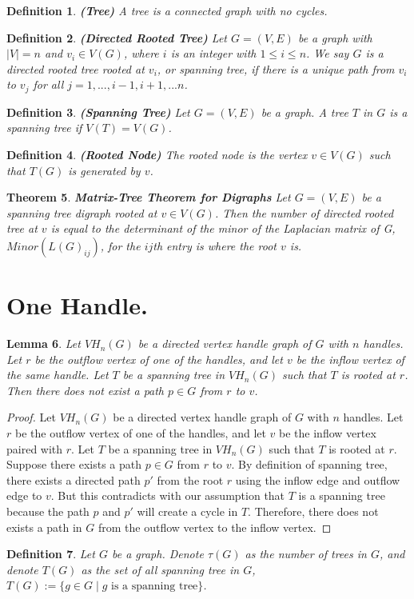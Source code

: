 \documentclass[twoside,11pt]{article}
\newtheorem{theorem}{Theorem}[section]
\newtheorem{lemma}[theorem]{Lemma}
\newtheorem{definition}[theorem]{Definition}
\numberwithin{equation}{section} \DeclareMathOperator{\Var}{Var}
\newcommand{\bpf}{\begin{proof}}
\newcommand{\epf}{\end{proof}}
\newcommand{\bdf}{\begin{definition}}
\newcommand{\edf}{\end{definition}}
\newcommand{\blm}{\begin{lemma}}
\newcommand{\elm}{\end{lemma}}
\newcommand{\bthm}{\begin{theorem}}
\newcommand{\ethm}{\end{theorem}}
\begin{document}
\bdf
{\bf (Tree)}
A tree is a connected graph with no cycles.
\edf

\bdf
{\bf (Directed  Rooted Tree)}
Let $G=(V,E)$ be a graph with $|V|=n$ and $v_i \in V(G)$, where $i$ is an integer with $1\leq i \leq n$.
We say $G$ is a directed  rooted tree rooted at $v_i$, or spanning tree, if there is a unique path from $v_i$ to $v_j$ for all $j=1,...,i-1,i+1,...n$.
\edf

\bdf
{\bf (Spanning Tree)}
Let $G=(V,E)$ be a graph. A tree $T$ in $G$ is a spanning tree if $V(T)= V(G)$. 
\edf

\bdf
{\bf (Rooted Node)}
The rooted node is the vertex $v \in V(G)$ such that $T(G)$ is generated by $v$.
\edf

\bthm
{\bf Matrix-Tree Theorem for Digraphs} 
Let $G = (V,E)$ be a spanning tree digraph rooted at $v\in V(G)$. Then the number of directed rooted tree at $v$ is equal to the determinant of the minor of the Laplacian matrix of G, $Minor(L(G)_{ij})$, for the $ij$th entry is where the root $v$ is. 
\ethm

\section{One Handle.}
\blm
\label{symhandle}
Let $VH_n(G)$ be a directed vertex handle graph of $G$ with $n$ handles. Let $r$ be the outflow vertex of one of the handles, and let $v$ be the inflow vertex of the same handle.
Let $T$ be a spanning tree in $VH_n(G)$ such that $T$ is rooted at $r$. Then there does not exist a path $p\in G$ from $r$ to $v$. 
\elm

\bpf
Let $VH_n(G)$ be a directed vertex handle graph of $G$ with $n$ handles. Let $r$ be the outflow vertex of one of the handles, and let $v$ be the inflow vertex paired with $r$.
Let $T$ be a spanning tree in $VH_n(G)$ such that $T$ is rooted at $r$.  Suppose there exists a path $p\in G$ from $r$ to $v$. By definition of spanning tree, there exists a directed path $p'$ from the root $r$ using the inflow edge and outflow edge to $v$. But this contradicts with our assumption that $T$ is a spanning tree because the path $p$ and $p'$ will create a cycle in $T$. Therefore, there does not exists a path in $G$ from the outflow vertex to the inflow vertex.
\epf

\bdf
Let $G$ be a graph. Denote $\tau(G)$ as the number of trees in $G$, and denote $T (G)$ as the set of all spanning tree in $G$,\\ $T(G):=\{g\in G \; |\;g \text{ is a spanning tree}  \}$.
\edf
\end{document}
